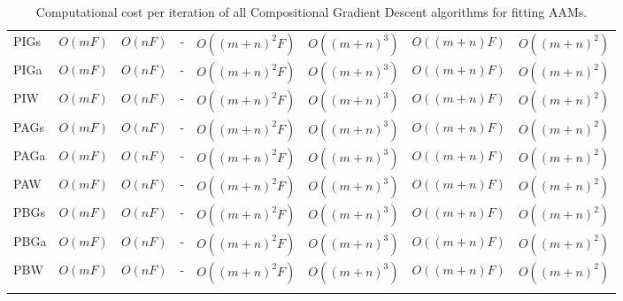 \begin{table*}
\begin{tabular}{lccccccc}
PIGs & $O(mF)$ & $O(nF)$ & - & $O((m+n)^2F)$ & $O((m+n)^3)$ & $O((m+n)F)$ & $O((m+n)^2)$ \\
PIGa & $O(mF)$ & $O(nF)$ & - & $O((m+n)^2F)$ & $O((m+n)^3)$ & $O((m+n)F)$ & $O((m+n)^2)$ \\
PIW & $O(mF)$ & $O(nF)$ & - & $O((m+n)^2F)$ & $O((m+n)^3)$ & $O((m+n)F)$ & $O((m+n)^2)$ \\

PAGs & $O(mF)$ & $O(nF)$ & - & $O((m+n)^2F)$ & $O((m+n)^3)$ & $O((m+n)F)$ & $O((m+n)^2)$ \\
PAGa & $O(mF)$ & $O(nF)$ & - & $O((m+n)^2F)$ & $O((m+n)^3)$ & $O((m+n)F)$ & $O((m+n)^2)$ \\
PAW & $O(mF)$ & $O(nF)$ & - & $O((m+n)^2F)$ & $O((m+n)^3)$ & $O((m+n)F)$ & $O((m+n)^2)$ \\

PBGs & $O(mF)$ & $O(nF)$ & - & $O((m+n)^2F)$ & $O((m+n)^3)$ & $O((m+n)F)$ & $O((m+n)^2)$ \\
PBGa & $O(mF)$ & $O(nF)$ & - & $O((m+n)^2F)$ & $O((m+n)^3)$ & $O((m+n)F)$ & $O((m+n)^2)$ \\
PBW & $O(mF)$ & $O(nF)$ & - & $O((m+n)^2F)$ & $O((m+n)^3)$ & $O((m+n)F)$ & $O((m+n)^2)$ \\

\noalign{\smallskip}\hline
\end{tabular}
\caption{Computational cost per iteration of all Compositional Gradient Descent algorithms for fitting AAMs.}
\label{tab:complexity}  
\end{table*}